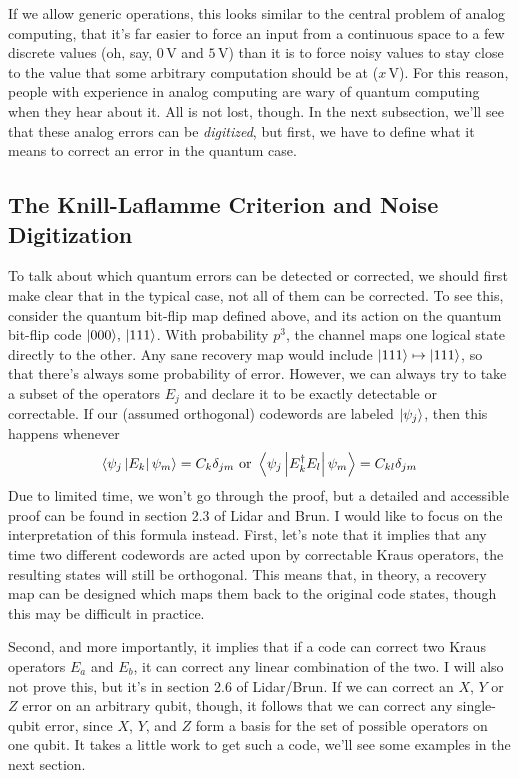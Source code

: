 \documentclass[10pt,a4paper, english]{scrartcl}
\providecommand{\volts}{\, \textrm{V}}
\begin{document}
If we allow generic operations, this looks similar to the central problem of analog computing, that it's far easier to force an input from a continuous space to a few discrete values (oh, say, $0 \volts$ and $5 \volts$) than it is to force noisy values to stay close to the value that some arbitrary computation should be at ($x \volts$). 
For this reason, people with experience in analog computing are wary of quantum computing when they hear about it. 
All is not lost, though. 
In the next subsection, we'll see that these analog errors can be \emph{digitized}, but first, we have to define what it means to correct an error in the quantum case.
\subsection{The Knill-Laflamme Criterion and Noise Digitization}
To talk about which quantum errors can be detected or corrected, we should first make clear that in the typical case, not all of them can be corrected. 
To see this, consider the quantum bit-flip map defined above, and its action on the quantum bit-flip code ${\left\vert{000}\right\rangle},\,{\left\vert{111}\right\rangle}$.
With probability $p^3$, the channel maps one logical state directly to the other. 
Any sane recovery map would include ${\left\vert{111}\right\rangle} \mapsto {\left\vert{111}\right\rangle}$, so that there's always some probability of error. 
However, we can always try to take a subset of the operators $E_j$ and declare it to be exactly detectable or correctable. 
If our (assumed orthogonal) codewords are labeled ${\left\vert{\psi_j}\right\rangle}$, then this happens whenever
\begin{equation}
\elem{\psi_j}{E_k}{\psi_m} = C_{k} \delta_{jm} \textrm{ or } \elem{\psi_j}{E_k\ct E_l}{\psi_m} = C_{kl} \delta_{jm}
\end{equation}
Due to limited time, we won't go through the proof, but a detailed and accessible proof can be found in section 2.3 of Lidar and Brun. 
I would like to focus on the interpretation of this formula instead. 
First, let's note that it implies that any time two different codewords are acted upon by correctable Kraus operators, the resulting states will still be orthogonal. 
This means that, in theory, a recovery map can be designed which maps them back to the original code states, though this may be difficult in practice. 

Second, and more importantly, it implies that if a code can correct two Kraus operators $E_a$ and $E_b$, it can correct any linear combination of the two.
I will also not prove this, but it's in section 2.6 of Lidar/Brun.
If we can correct an $X$, $Y$ or $Z$ error on an arbitrary qubit, though, it follows that we can correct any single-qubit error, since $X$, $Y$, and $Z$ form a basis for the set of possible operators on one qubit.
It takes a little work to get such a code, we'll see some examples in the next section. 
\end{document}

